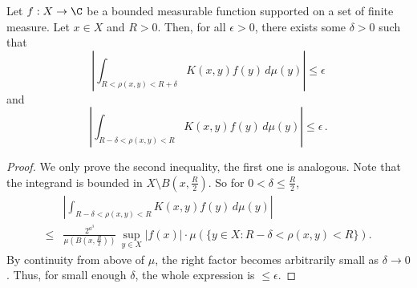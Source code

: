 \begin{lemma} \label{small-annulus}
    \leanok
    Let $f:X\to\C$ be a bounded measurable function supported on a set of finite measure.
    Let $x\in X$ and $R>0$.
    Then, for all $\epsilon>0$, there exists some $\delta>0$ such that
    \begin{equation}
        \left| \int_{R<\rho(x,y)<R+\delta} K(x,y) f(y) \, d\mu(y) \right| \le \epsilon
    \end{equation}
    and
    \begin{equation}
        \left| \int_{R-\delta<\rho(x,y)<R} K(x,y) f(y) \, d\mu(y) \right| \le \epsilon \,.
    \end{equation}
\end{lemma}
\begin{proof}
\leanok
We only prove the second inequality, the first one is analogous.
Note that the integrand is bounded in $X\setminus B(x,\frac{R}{2})$. So for $0<\delta\le\frac{R}{2}$,
\begin{align*}
    &\left| \int_{R-\delta<\rho(x,y)<R} K(x,y) f(y) \, d\mu(y) \right| \\
    \le &\frac{2^{a^3}}{\mu(B(x,\frac{R}{2}))} \, \sup_{y\in X}|f(x)| \cdot \mu(\{y\in X: R-\delta<\rho(x,y)<R\}).
\end{align*}
By continuity from above of $\mu$, the right factor becomes arbitrarily small as $\delta\rightarrow 0$. Thus, for small enough $\delta$, the whole expression is $\le\epsilon$.
\end{proof}

